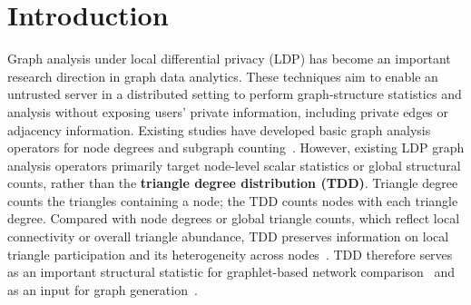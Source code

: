 \section{Introduction}
\label{sec:introduction}
Graph analysis under local differential privacy (LDP) has become an important research direction in graph data analytics.
These techniques aim to enable an untrusted server in a distributed setting to perform graph-structure statistics and analysis without exposing users' private information, including private edges or adjacency information.
Existing studies have developed basic graph analysis operators for node degrees and subgraph counting~\cite{imola2021locally,Ye2022}.
However, existing LDP graph analysis operators primarily target node-level scalar statistics or global structural counts, rather than the \textbf{triangle degree distribution (TDD)}. %
Triangle degree counts the triangles containing a node; the TDD counts nodes with each triangle degree.
Compared with node degrees or global triangle counts, which reflect local connectivity or overall triangle abundance, TDD preserves information on local triangle participation and its heterogeneity across nodes~\cite{becchetti2008local,antunes2021sampling}.
TDD therefore serves as an important structural statistic for graphlet-based network comparison~\cite{LDPGDDPrzulj2007,hayes2013graphlet} and as an input for graph generation~\cite{zahirnia2023neural}.



